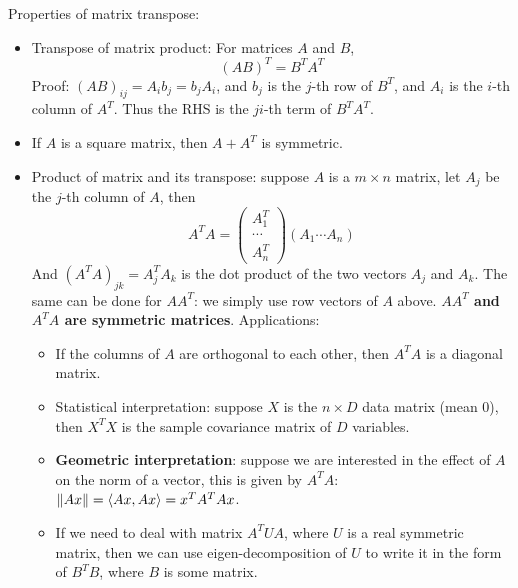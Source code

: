 \documentclass{report}
\begin{document}
Properties of matrix transpose: 
\begin{itemize}
\item Transpose of matrix product: For matrices $A$ and $B$, 
\begin{equation}
(AB)^T = B^T A^T	
\end{equation}
Proof: $(AB)_{ij} = A_i b_j = b_j A_i$, and $b_j$ is the $j$-th row of $B^T$, and $A_i$ is the $i$-th column of $A^T$. Thus the RHS is the $ji$-th term of $B^T A^T$. 
	
\item If $A$ is a square matrix, then $A + A^T$ is symmetric. 

\item Product of matrix and its transpose: suppose $A$ is a $m \times n$ matrix, let $A_j$ be the $j$-th column of $A$, then 
\begin{equation}
A^T A = \left( \begin{array}{c} A_1^T\\ \cdots \\ A_n^T \end{array} \right)	\left(A_1 \cdots A_n \right) 
\end{equation}
And $(A^T A)_{jk} = A_j^T A_k$ is the dot product of the two vectors $A_j$ and $A_k$. The same can be done for $A A^T$: we simply use row vectors of $A$ above. \textbf{$AA^T$ and $A^T A$ are symmetric matrices}. Applications: 
\begin{itemize}
	\item If the columns of $A$ are orthogonal to each other, then $A^T A$ is a diagonal matrix. 
	\item Statistical interpretation: suppose $X$ is the $n \times D$ data matrix (mean 0), then $X^T X$ is the sample covariance matrix of $D$ variables. 
	\item \textbf{Geometric interpretation}: suppose we are interested in the effect of $A$ on the norm of a vector, this is given by $A^TA$: $\lVert Ax\rVert = \langle Ax, Ax \rangle = x^T A^T A x$. 
	\item If we need to deal with matrix $A^T U A$, where $U$ is a real symmetric matrix, then we can use eigen-decomposition of $U$ to write it in the form of $B^T B$, where $B$ is some matrix. 
\end{itemize}
\end{itemize}
\end{document}
